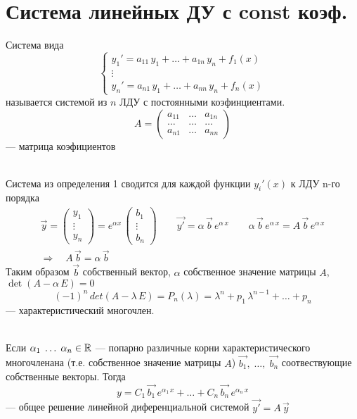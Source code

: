 \section{Система линейных ДУ с const коэф.}

\begin{Def}
    Система вида
    \[
    \begin{cases}
        y_1'= a_{11}\,y_1 + \dots + a_{1n}\,y_n + f_1(x)\\
        \vdots\\
        y_n' = a_{n1}\,y_1 + \dots + a_{nn}\,y_n + f_n(x)
    \end{cases}
    \]
    называется системой из $n$ ЛДУ с постоянными коэфинциентами.\\
    \[
        A=
        \begin{pmatrix} 
            a_{11}& \dots & a_{1n}\\  
            \dots& \dots & \dots\\ 
            a_{n1}& \dots & a_{nn}
        \end{pmatrix}
    \]
    --- матрица коэфициентов
\end{Def}

\begin{Note}~\\
    Система из определения 1 сводится для каждой функции $y_i'(x)$ к ЛДУ n-го порядка
    \begin{gather*}
        \vec{y} = \begin{pmatrix} y_{1}\\ \vdots\\ y_{n}\end{pmatrix} = e^{\alpha x}\, \begin{pmatrix} b_{1}\\ \vdots\\ b_{n} \end{pmatrix} \qquad
        \vec{y'} = \alpha\,\vec{b}\,e^{\alpha\,x} \qquad \alpha\,\vec{b}\,e^{\alpha\,x} = A\,\vec{b}\,e^{\alpha\,x}\\
        \Rightarrow \quad A\,\vec{b}=\alpha\,\vec{b}
    \end{gather*}
    Таким образом $\vec{b}$ собственный вектор, $\alpha$ собственное значение матрицы $A$,  $\det(A-\alpha\,E)=0$\\
    \[
        (-1)^n\,det(A-\lambda\, E) = P_n(\lambda)=\lambda^n + p_1\,\lambda^{n-1} + \dots + p_n
    \]
    --- характеристический многочлен.
\end{Note}

\begin{Note}~\\
    Если $\alpha_1\;\dots\;\alpha_n \in \mathbb{R}$ --- попарно различные корни характеристического многочленана (т.е. собственное значение матрицы $A$)
    $\vec{b_1},\; \dots,\; \vec{b_n}$ соотвествующие собственные векторы. Тогда 
    \[
        y=C_1\,\vec{b_1}\,e^{\alpha_1\,x} + \dots + C_n\,\vec{b_n}\,e^{\alpha_n\,x}
    \]
    --- общее решение линейной диференциальной системой $\vec{y'}=A\,\vec{y}$
\end{Note}

